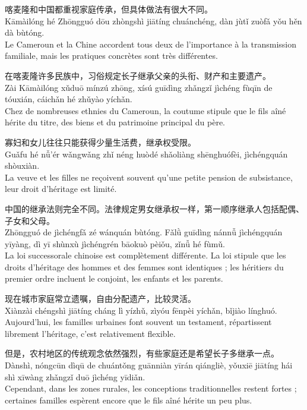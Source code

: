 \documentclass[11pt]{article}
\begin{document}
\begin{textebox}
喀麦隆和中国都重视家庭传承，但具体做法有很大不同。\\
Kāmàilóng hé Zhōngguó dōu zhòngshì jiātíng chuánchéng, dàn jùtǐ zuòfǎ yǒu hěn dà bùtóng.\\
Le Cameroun et la Chine accordent tous deux de l'importance à la transmission familiale, mais les pratiques concrètes sont très différentes.

在喀麦隆许多民族中，习俗规定长子继承父亲的头衔、财产和主要遗产。\\
Zài Kāmàilóng xǔduō mínzú zhōng, xísú guīdìng zhǎngzǐ jìchéng fùqīn de tóuxián, cáichǎn hé zhǔyào yíchǎn.\\
Chez de nombreuses ethnies du Cameroun, la coutume stipule que le fils aîné hérite du titre, des biens et du patrimoine principal du père.

寡妇和女儿往往只能获得少量生活费，继承权受限。\\
Guǎfu hé nǚ'ér wǎngwǎng zhǐ néng huòdé shǎoliàng shēnghuófèi, jìchéngquán shòuxiàn.\\
La veuve et les filles ne reçoivent souvent qu'une petite pension de subsistance, leur droit d'héritage est limité.

中国的继承法则完全不同。法律规定男女继承权一样，第一顺序继承人包括配偶、子女和父母。\\
Zhōngguó de jìchéngfǎ zé wánquán bùtóng. Fǎlǜ guīdìng nánnǚ jìchéngquán yīyàng, dì yī shùnxù jìchéngrén bāokuò pèiǒu, zǐnǚ hé fùmǔ.\\
La loi successorale chinoise est complètement différente. La loi stipule que les droits d'héritage des hommes et des femmes sont identiques ; les héritiers du premier ordre incluent le conjoint, les enfants et les parents.

现在城市家庭常立遗嘱，自由分配遗产，比较灵活。\\
Xiànzài chéngshì jiātíng cháng lì yízhǔ, zìyóu fēnpèi yíchǎn, bǐjiào línghuó.\\
Aujourd'hui, les familles urbaines font souvent un testament, répartissent librement l'héritage, c'est relativement flexible.

但是，农村地区的传统观念依然强烈，有些家庭还是希望长子多继承一点。\\
Dànshì, nóngcūn dìqū de chuántǒng guānniàn yīrán qiángliè, yǒuxiē jiātíng hái shì xīwàng zhǎngzǐ duō jìchéng yīdiǎn.\\
Cependant, dans les zones rurales, les conceptions traditionnelles restent fortes ; certaines familles espèrent encore que le fils aîné hérite un peu plus.


\end{textebox}
\end{document}
